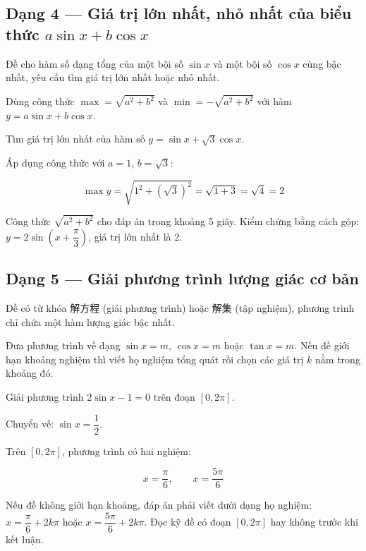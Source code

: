 \documentclass[11pt, a4paper]{article}
\begin{document}
\subsection{Dạng 4 — Giá trị lớn nhất, nhỏ nhất của biểu thức $a\sin x + b\cos x$}

 Đề cho hàm số dạng tổng của một bội số $\sin x$ và một bội số $\cos x$ cùng bậc nhất, yêu cầu tìm giá trị lớn nhất hoặc nhỏ nhất.

 Dùng công thức $\max = \sqrt{a^2 + b^2}$ và $\min = -\sqrt{a^2 + b^2}$ với hàm $y = a\sin x + b\cos x$.

\begin{vidu}[{4}]
Tìm giá trị lớn nhất của hàm số $y = \sin x + \sqrt{3}\cos x$.

Áp dụng công thức với $a = 1$, $b = \sqrt{3}$:

$$\max y = \sqrt{1^2 + (\sqrt{3})^2} = \sqrt{1 + 3} = \sqrt{4} = 2$$

 Công thức $\sqrt{a^2 + b^2}$ cho đáp án trong khoảng 5 giây. Kiểm chứng bằng cách gộp: $y = 2\sin\left(x + \dfrac{\pi}{3}\right)$, giá trị lớn nhất là $2$.

\end{vidu}
\subsection{Dạng 5 — Giải phương trình lượng giác cơ bản}

 Đề có từ khóa 解方程 (giải phương trình) hoặc 解集 (tập nghiệm), phương trình chỉ chứa một hàm lượng giác bậc nhất.

 Đưa phương trình về dạng $\sin x = m$, $\cos x = m$ hoặc $\tan x = m$. Nếu đề giới hạn khoảng nghiệm thì viết họ nghiệm tổng quát rồi chọn các giá trị $k$ nằm trong khoảng đó.

\begin{vidu}[{5}]
Giải phương trình $2\sin x - 1 = 0$ trên đoạn $[0, 2\pi]$.

Chuyển vế: $\sin x = \dfrac{1}{2}$.

Trên $[0, 2\pi]$, phương trình có hai nghiệm:

$$x = \frac{\pi}{6}, \qquad x = \frac{5\pi}{6}$$

 Nếu đề không giới hạn khoảng, đáp án phải viết dưới dạng họ nghiệm: $x = \dfrac{\pi}{6} + 2k\pi$ hoặc $x = \dfrac{5\pi}{6} + 2k\pi$. Đọc kỹ đề có đoạn $[0, 2\pi]$ hay không trước khi kết luận.

\end{vidu}
\end{document}

